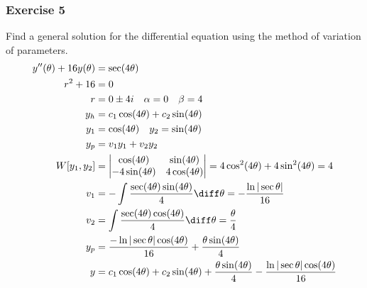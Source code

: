 \documentclass{math}
\begin{document}
\subsubsection*{Exercise 5}
Find a general solution for the differential equation using the method of
variation of parameters.
\begin{align*}
  y''(\theta)+16y(\theta) &= \sec(4\theta) \\
  r^2+16 &= 0 \\
  r &= 0\pm4i \quad \alpha = 0 \quad \beta = 4 \\
  y_h &= c_1\cos(4\theta)+c_2\sin(4\theta) \\
  y_1 &= \cos(4\theta) \quad y_2 = \sin(4\theta) \\
  y_p &= v_1y_1+v_2y_2 \\
  W[y_1,y_2] &= \begin{vmatrix}
    \cos(4\theta) & \sin(4\theta) \\
    -4\sin(4\theta) & 4\cos(4\theta)
  \end{vmatrix} = 4\cos^2(4\theta)+4\sin^2(4\theta) = 4 \\
  v_1 &= -\int\frac{\sec(4\theta)\sin(4\theta)}{4}\diff\theta =
    -\frac{\ln|\sec\theta|}{16} \\
  v_2 &= \int\frac{\sec(4\theta)\cos(4\theta)}{4}\diff\theta =
    \frac{\theta}{4} \\
  y_p &= \frac{-\ln|\sec\theta|\cos(4\theta)}{16}+
    \frac{\theta\sin(4\theta)}{4} \\
  y &= c_1\cos(4\theta)+c_2\sin(4\theta)+
    \frac{\theta\sin(4\theta)}{4}-\frac{\ln|\sec\theta|\cos(4\theta)}{16} \\
\end{align*}
\end{document}
